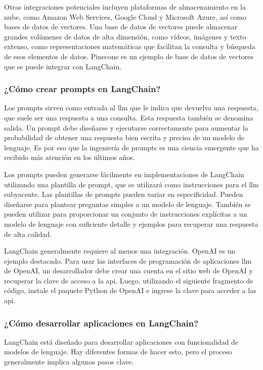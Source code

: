 Otras integraciones potenciales incluyen plataformas de almacenamiento en la nube, como Amazon Web Services, Google Cloud y Microsoft Azure, así como bases de datos de vectores. Una base de datos de vectores puede almacenar grandes volúmenes de datos de alta dimensión, como vídeos, imágenes y texto extenso, como representaciones matemáticas que facilitan la consulta y búsqueda de esos elementos de datos. Pinecone es un ejemplo de base de datos de vectores que se puede integrar con LangChain.

\subsubsection{¿Cómo crear prompts en LangChain?}
Los prompts sirven como entrada al \acrshort{llm} que le indica que devuelva una respuesta, que suele ser una respuesta a una consulta. Esta respuesta también se denomina salida. Un prompt debe diseñarse y ejecutarse correctamente para aumentar la probabilidad de obtener una respuesta bien escrita y precisa de un modelo de lenguaje. Es por eso que la ingeniería de prompts es una ciencia emergente que ha recibido más atención en los últimos años.

Los prompts pueden generarse fácilmente en implementaciones de LangChain utilizando una plantilla de prompt, que se utilizará como instrucciones para el \acrshort{llm} subyacente. Las plantillas de prompts pueden variar en especificidad. Pueden diseñarse para plantear preguntas simples a un modelo de lenguaje. También se pueden utilizar para proporcionar un conjunto de instrucciones explícitas a un modelo de lenguaje con suficiente detalle y ejemplos para recuperar una respuesta de alta calidad.

LangChain generalmente requiere al menos una integración. OpenAI es un ejemplo destacado. Para usar las interfaces de programación de aplicaciones \acrshort{llm} de OpenAI, un desarrollador debe crear una cuenta en el sitio web de OpenAI y recuperar la clave de acceso a la \acrshort{api}. Luego, utilizando el siguiente fragmento de código, instale el paquete Python de OpenAI e ingrese la clave para acceder a las \acrshort{api}.

\subsubsection{¿Cómo desarrollar aplicaciones en LangChain?}
LangChain está diseñado para desarrollar aplicaciones con funcionalidad de modelos de lenguaje. Hay diferentes formas de hacer esto, pero el proceso generalmente implica algunos pasos clave.

